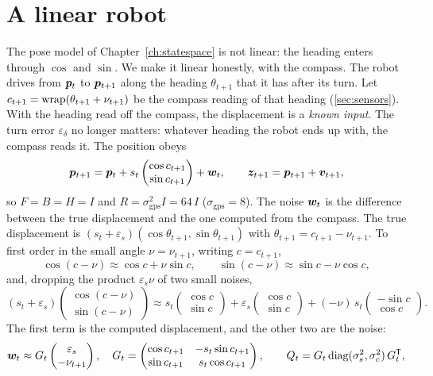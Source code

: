 \section{A linear robot}
\label{sec:linmower}

The pose model of Chapter~\ref{ch:statespace} is not linear: the heading
enters through $\cos$ and $\sin$. We make it linear honestly, with the
compass. The robot drives from $\bm{p}_t$ to $\bm{p}_{t+1}$ along the heading
$\theta_{t+1}$ that it has after its turn. Let
$c_{t+1}=\operatorname{wrap}(\theta_{t+1}+\nu_{t+1})$ be the compass reading of that
heading (\cref{sec:sensors}). With the heading read off the compass, the
displacement is a \emph{known input}. The turn error $\varepsilon_\delta$
no longer matters: whatever heading the robot ends up with, the compass
reads it. The position obeys
\begin{equation}\label{eq:linmower}
  \bm{p}_{t+1}=\bm{p}_t+s_t\begin{pmatrix}\cos c_{t+1}\\\sin c_{t+1}\end{pmatrix}
  +\bm{w}_t,\qquad\bm{z}_{t+1}=\bm{p}_{t+1}+\bm{v}_{t+1},
\end{equation}
so $F=B=H=I$ and $R=\sigma_{\mathrm{gps}}^2I=64\,I$
($\sigma_{\mathrm{gps}}=8$). The noise $\bm{w}_t$ is the difference between
the true displacement and the one computed from the compass. The true
displacement is $(s_t+\varepsilon_s)(\cos\theta_{t+1},\sin\theta_{t+1})$
with $\theta_{t+1}=c_{t+1}-\nu_{t+1}$. To first order in the small angle
$\nu=\nu_{t+1}$, writing $c=c_{t+1}$,
\[
  \cos(c-\nu)\approx\cos c+\nu\sin c,\qquad
  \sin(c-\nu)\approx\sin c-\nu\cos c ,
\]
and, dropping the product $\varepsilon_s\nu$ of two small noises,
\[
  (s_t+\varepsilon_s)\begin{pmatrix}\cos(c-\nu)\\\sin(c-\nu)\end{pmatrix}
  \approx s_t\begin{pmatrix}\cos c\\\sin c\end{pmatrix}
  +\varepsilon_s\begin{pmatrix}\cos c\\\sin c\end{pmatrix}
  +(-\nu)\,s_t\begin{pmatrix}-\sin c\\\cos c\end{pmatrix}.
\]
The first term is the computed displacement, and the other two are the
noise:
\[
  \bm{w}_t\approx G_t\begin{pmatrix}\varepsilon_s\\-\nu_{t+1}\end{pmatrix},\quad
  G_t=\begin{pmatrix}\cos c_{t+1}&-s_t\sin c_{t+1}\\
  \sin c_{t+1}&s_t\cos c_{t+1}\end{pmatrix},\qquad
  Q_t=G_t\operatorname{diag}(\sigma_s^2,\sigma_c^2)\,G_t^{\mathsf{T}} ,
\]
